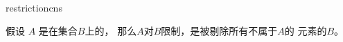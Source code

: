 \begin{modnl}[creator=hang]{restriction}{cns}
	\begin{definition}[id=restriction.def]
	假设 $A$ 是在集合$B$上的，
	那么$A$对$B$限制，是被剔除所有不属于$A$的
	元素的$B$。
	\end{definition}
\end{modnl}
